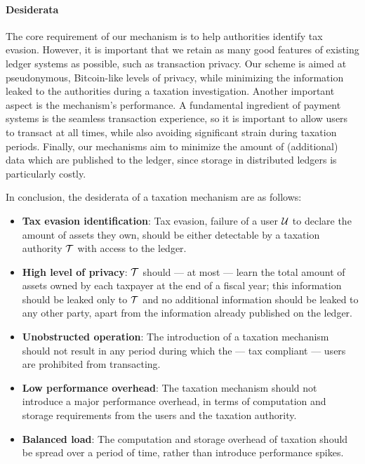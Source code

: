\paragraph{Desiderata}\label{subsec:desiderata}
The core requirement of our mechanism is to help authorities identify tax
evasion. However, it is important that we retain as many good features of
existing ledger systems as possible, such as transaction privacy. Our scheme is
aimed at pseudonymous, Bitcoin-like levels of privacy, while minimizing the
information leaked to the authorities during a taxation investigation.  Another
important aspect is the mechanism's performance. A fundamental ingredient of
payment systems is the seamless transaction experience, so it is important to
allow users to transact at all times, while also avoiding significant strain
during taxation periods. Finally, our mechanisms aim to minimize the amount of
(additional) data which are published to the ledger, since storage in
distributed ledgers is particularly costly.

In conclusion, the desiderata of a taxation mechanism are as follows:
\begin{itemize}
    \item \textbf{Tax evasion identification}: Tax evasion, \ie failure of a
        user $\mathcal{U}$ to declare the amount of assets they own, should be either
        detectable by a taxation authority $\mathcal{T}$ with access to the
        ledger.
    \item \textbf{High level of privacy}: $\mathcal{T}$ should --- at most ---
        learn the total amount of assets owned by each taxpayer at the end of a
        fiscal year; this information should be leaked only to $\mathcal{T}$ and
        no additional information should be leaked to any other party, apart
        from the information already published on the ledger.
    \item \textbf{Unobstructed operation}: The introduction of a taxation
        mechanism should not result in any period during which the --- tax
        compliant --- users are prohibited from transacting.
    \item \textbf{Low performance overhead}: The taxation mechanism should not
        introduce a major performance overhead, in terms of computation and
        storage requirements from the users and the taxation authority.
    \item \textbf{Balanced load}: The computation and storage overhead of
        taxation should be spread over a period of time, rather than introduce
        performance spikes.
\end{itemize}
